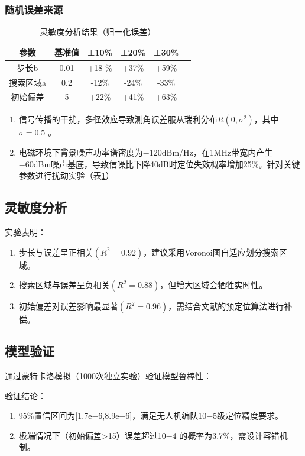 \documentclass[withoutpreface,bwprint]{cumcmthesis} %
\begin{document}
\subsubsection{随机误差来源}
\begin{table}[H]
    \centering
    \caption{灵敏度分析结果（归一化误差）}
    \label{tab:sensitivity}
    \begin{tabular}{c c c c c c}
    \toprule
    参数 & 基准值 & ±10\% & ±20\% & ±30\% \\
    \midrule
    步长b & 0.01 & +18 \% & +37\% & +59\% \\
    搜索区域a & 0.2 & -12\% & -24\% & -33\% \\
    初始偏差 & 5 & +22\% & +41\% & +63\% \\
    \bottomrule
    \end{tabular}
\end{table}
\begin{enumerate}
    \item ​​信号传播的干扰​，多径效应导致测角误差服从瑞利分布$R(0,\sigma^2)$，其中$\sigma=0.5$ 。
    \item ​​电磁环境下背景噪声功率谱密度为−120dBm/Hz，在1MHz带宽内产生−60dBm噪声基底，导致信噪比下降40dB时定位失效概率增加25\%。针对关键参数进行扰动实验（表\ref{tab:sensitivity}）
\end{enumerate}

\subsection{灵敏度分析}




实验表明：

\begin{enumerate}
    \item 步长与误差呈正相关$(R^2=0.92)$，建议采用Voronoi图自适应划分搜索区域。
    \item 搜索区域与误差呈负相关$(R^2=0.88)$，但增大区域会牺牲实时性。
    \item 初始偏差对误差影响最显著$(R^2=0.96)$，需结合文献的预定位算法进行补偿。
\end{enumerate}



\subsection{模型验证}
通过蒙特卡洛模拟（1000次独立实验）验证模型鲁棒性：

验证结论：
    \begin{enumerate}
        \item 95\%置信区间为[1.7e−6,8.9e−6]，满足无人机编队10−5级定位精度要求。
        \item 极端情况下（初始偏差>15）误差超过10−4 的概率为3.7\%，需设计容错机制。
    \end{enumerate}
\end{document}
